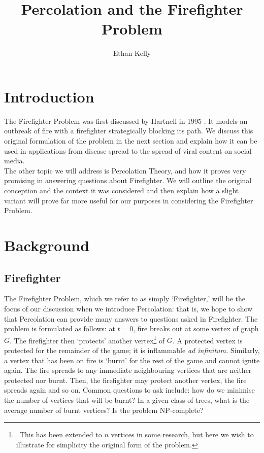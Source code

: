 \documentclass[11pt]{amsart}
\title{Percolation and the Firefighter Problem}
\author{Ethan Kelly}%
\begin{document}
\maketitle

\section{Introduction}
\label{sec:intro}

The Firefighter Problem was first discussed by Hartnell in 1995 \cite{hartnell95}. It models an outbreak of fire with a firefighter strategically blocking its path. We discuss this original formulation of the problem in the next section and explain how it can be used in applications from disease spread to the spread of viral content on social media.\\

The other topic we will address is Percolation Theory, and how it proves very promising in answering questions about Firefighter. We will outline the original conception and the context it was considered and then explain how a slight variant will prove far more useful for our purposes in considering the Firefighter Problem.


\section{Background}

\subsection{Firefighter}

The Firefighter Problem, which we refer to as simply `Firefighter,' will be the focus of our discussion when we introduce Percolation: that is, we hope to show that Percolation can provide many answers to questions asked in Firefighter. The problem is formulated as follows: at $t=0$, fire breaks out at some vertex of graph $G$. The firefighter then `protects' another vertex\footnote{\, This has been extended to $n$ vertices in some research, but here we wish to illustrate for simplicity the original form of the problem.} of $G$. A protected vertex is protected for the remainder of the game; it is inflammable \textit{ad infinitum.} Similarly, a vertex that has been on fire is `burnt' for the rest of the game and cannot ignite again. The fire spreads to any immediate neighbouring vertices that are neither protected nor burnt. Then, the firefighter may protect another vertex, the fire spreads again and so on. Common questions to ask include: how do we minimise the number of vertices that will be burnt? In a given class of trees, what is the average number of burnt vertices? Is the problem NP-complete?\\
\end{document}
